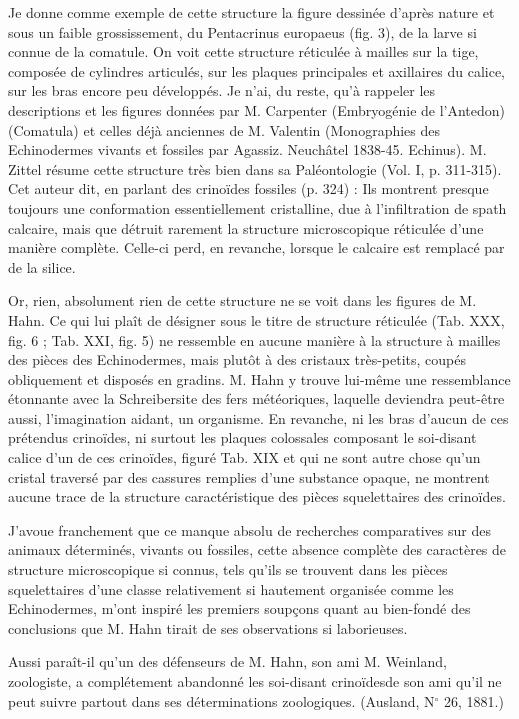 \documentclass[a4paper, 12pt, oneside, french]{book}
\begin{document}
Je donne comme exemple de cette structure la figure dessinée d'après nature et sous un faible grossissement, du Pentacrinus europaeus (fig. 3), de la larve si connue de la comatule. On voit cette structure réticulée à mailles sur la tige, composée de cylindres articulés, sur les plaques principales et axillaires du calice, sur les bras encore peu développés. Je n'ai, du reste, qu'à rappeler les descriptions et les figures données par M. Carpenter (Embryogénie de l'Antedon) (Comatula) et celles déjà anciennes de M. Valentin (Monographies des Echinodermes vivants et fossiles par Agassiz. Neuchâtel 1838-45. Echinus). M. Zittel résume cette structure très bien dans sa Paléontologie (Vol. I, p. 311-315). Cet auteur dit, en parlant des crinoïdes fossiles (p. 324) : \og Ils montrent presque toujours une conformation essentiellement cristalline, due à l'infiltration de spath calcaire, mais que détruit rarement la structure microscopique réticulée d'une manière complète. Celle-ci perd, en revanche, lorsque le calcaire est remplacé par de la silice. \fg

Or, rien, absolument rien de cette structure ne se voit dans les figures de M. Hahn. Ce qui lui plaît de désigner sous le titre de \og structure réticulée \fg (Tab. XXX, fig. 6 ; Tab. XXI, fig. 5) ne ressemble en aucune manière à la structure à mailles des pièces des Echinodermes, mais plutôt à des cristaux très-petits, coupés obliquement et disposés en gradins. M. Hahn y trouve lui-même une ressemblance \og étonnante \fg avec la Schreibersite des fers météoriques, laquelle deviendra peut-être aussi, l'imagination aidant, un organisme. En revanche, ni les bras d'aucun de ces prétendus crinoïdes, ni surtout les plaques colossales composant le soi-disant calice d'un de ces crinoïdes, figuré Tab. XIX et qui ne sont autre chose qu'un cristal traversé par des cassures remplies d'une substance opaque, ne montrent aucune trace de la structure caractéristique des pièces squelettaires des crinoïdes.

J'avoue franchement que ce manque absolu de recherches comparatives sur des animaux déterminés, vivants ou fossiles, cette absence complète des caractères de structure microscopique si connus, tels qu'ils se trouvent dans les pièces squelettaires d'une classe relativement si hautement organisée comme les Echinodermes, m'ont inspiré les premiers soupçons quant au bien-fondé des conclusions que M. Hahn tirait de ses observations si laborieuses.

Aussi paraît-il qu'un des défenseurs de M. Hahn, son ami M. Weinland, zoologiste, a complétement abandonné les \og soi-disant crinoïdes\fg de son ami \og qu'il ne peut suivre partout dans ses déterminations zoologiques. \fg (Ausland, N$^{\circ}$ 26, 1881.)
\end{document}
